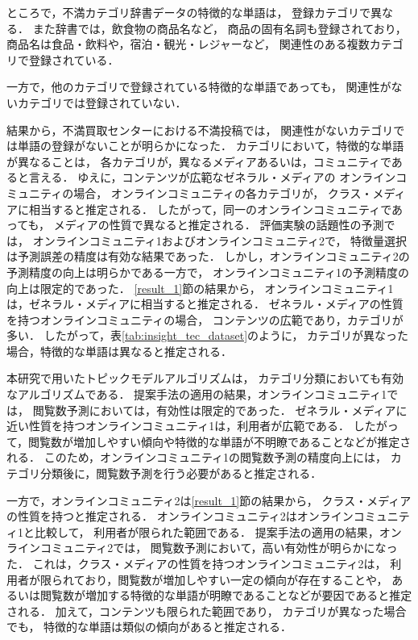 \documentclass[12pt,a4paper,twocolumn,twoside]{jsik}
\begin{document}
ところで，不満カテゴリ辞書データの特徴的な単語は，
登録カテゴリで異なる．
%
また辞書では，飲食物の商品名など，
商品の固有名詞も登録されており，
商品名は食品・飲料や，宿泊・観光・レジャーなど，
関連性のある複数カテゴリで登録されている．

\newpage
一方で，他のカテゴリで登録されている特徴的な単語であっても，
関連性がないカテゴリでは登録されていない．

結果から，不満買取センターにおける不満投稿では，
関連性がないカテゴリでは単語の登録がないことが明らかになった．
%
カテゴリにおいて，特徴的な単語が異なることは，
各カテゴリが，異なるメディアあるいは，コミュニティであると言える．
%
ゆえに，コンテンツが広範なゼネラル・メディアの
オンラインコミュニティの場合，
オンラインコミュニティの各カテゴリが，
クラス・メディアに相当すると推定される．
%
したがって，同一のオンラインコミュニティであっても，
メディアの性質で異なると推定される．
%
評価実験の話題性の予測では，
オンラインコミュニティ1およびオンラインコミュニティ2で，
特徴量選択は予測誤差の精度は有効な結果であった．
しかし，オンラインコミュニティ2の予測精度の向上は明らかである一方で，
オンラインコミュニティ1の予測精度の向上は限定的であった．
%
\ref{result_1}節の結果から，
オンラインコミュニティ1は，ゼネラル・メディアに相当すると推定される．
ゼネラル・メディアの性質を持つオンラインコミュニティの場合，
コンテンツの広範であり，カテゴリが多い．
したがって，表\ref{tab:insight_tec_dataset}のように，
カテゴリが異なった場合，特徴的な単語は異なると推定される．

本研究で用いたトピックモデルアルゴリズムは，
カテゴリ分類においても有効なアルゴリズムである．
%
提案手法の適用の結果，オンラインコミュニティ1では，
閲覧数予測においては，有効性は限定的であった．
%
ゼネラル・メディアに近い性質を持つオンラインコミュニティ1は，利用者が広範である．
したがって，閲覧数が増加しやすい傾向や特徴的な単語が不明瞭であることなどが推定される．
%
このため，オンラインコミュニティ1の閲覧数予測の精度向上には，
カテゴリ分類後に，閲覧数予測を行う必要があると推定される．

一方で，オンラインコミュニティ2は\ref{result_1}節の結果から，
クラス・メディアの性質を持つと推定される．
オンラインコミュニティ2はオンラインコミュニティ1と比較して，
利用者が限られた範囲である．
%
提案手法の適用の結果，オンラインコミュニティ2では，
閲覧数予測において，高い有効性が明らかになった．
%
これは，クラス・メディアの性質を持つオンラインコミュニティ2は，
利用者が限られており，閲覧数が増加しやすい一定の傾向が存在することや，
あるいは閲覧数が増加する特徴的な単語が明瞭であることなどが要因であると推定される．
%
加えて，コンテンツも限られた範囲であり，
カテゴリが異なった場合でも，
特徴的な単語は類似の傾向があると推定される．
\end{document}
